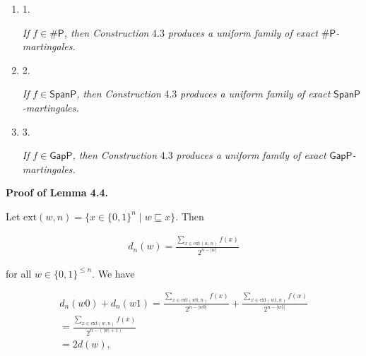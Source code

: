 \documentclass[10pt,a4paper]{article}
\begin{document}
\begin{enumerate}


\item[] 
1. 


\emph{If }$f\in{\mathsf{\#}\mathsf{P}}$\emph{, then Construction }4.3\emph{
produces a uniform family of exact }${\mathsf{\#}\mathsf{P}}$\emph{-martingales.}\par





\item[] 
2. 


\emph{If }$f\in\mathsf{SpanP}$\emph{, then Construction }4.3\emph{
produces a uniform family of exact }$\mathsf{SpanP}$\emph{-martingales.}\par





\item[] 
3. 


\emph{If }$f\in\mathsf{GapP}$\emph{, then Construction }4.3\emph{
produces a uniform family of exact }$\mathsf{GapP}$\emph{-martingales.}\par





\end{enumerate}






\par\medskip\noindent\textbf{Proof of Lemma 4.4.}\par




Let $\mathrm{ext}(w,n)=\{x\in\{0,1\}^{n}\mid w\sqsubseteq x\}$.
Then\par


\[\begin{gathered}
d_{n}(w)=\frac{\sum\limits_{x\in\mathrm{ext}(w,n)}f(x)}{2^{n-|w|}}
\end{gathered}\]


for all
$w\in\{0,1\}^{\leq n}.$
We have\par


\[\begin{gathered}
\displaystyle d_{n}(w0)+d_{n}(w1) \displaystyle= \displaystyle\frac{\sum\limits_{x\in\mathrm{ext}(w0,n)}f(x)}{2^{n-|w0|}}+\frac{\sum\limits_{x\in\mathrm{ext}(w1,n)}f(x)}{2^{n-|w1|}} \\
\displaystyle= \displaystyle\frac{\sum\limits_{x\in\mathrm{ext}(w,n)}f(x)}{2^{n-(|w|+1)}} \\
\displaystyle= \displaystyle 2d(w),
\end{gathered}\]
\end{document}
